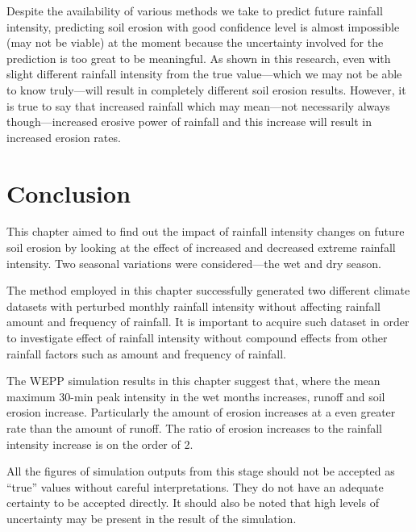 

Despite the availability of various methods we take to predict future rainfall
intensity, predicting soil erosion with good confidence level is almost
impossible (may not be viable) at the moment because the uncertainty involved
for the prediction is too great to be meaningful. As shown in this research,
even with slight different rainfall intensity from the true value---which we may
not be able to know truly---will result in completely different soil erosion
results. However, it is true to say that increased rainfall which may mean---not
necessarily always though---increased erosive power of rainfall and this
increase will result in increased erosion rates.

\section{Conclusion}
\label{sec:EstimatedFutureSoilErosionChapterConclusion}
This chapter aimed to find out the impact of rainfall intensity changes on
future soil erosion by looking at the effect of increased and decreased extreme
rainfall intensity. Two seasonal variations were considered---the wet and dry
season.

The method employed in this chapter successfully generated two different climate
datasets with perturbed monthly rainfall intensity without affecting rainfall
amount and frequency of rainfall. It is important to acquire such dataset in
order to investigate effect of rainfall intensity without compound effects from
other rainfall factors such as amount and frequency of rainfall.

The WEPP simulation results in this chapter suggest that, where the mean maximum
30-min peak intensity in the wet months increases, runoff and soil erosion
increase. Particularly the amount of erosion increases at a even greater rate
than the amount of runoff. The ratio of erosion increases to the rainfall
intensity increase is on the order of 2.

All the figures of simulation outputs from this stage should not be accepted as
``true'' values without careful interpretations. They do not have an adequate
certainty to be accepted directly. It should also be noted that high levels of
uncertainty may be present in the result of the simulation.


